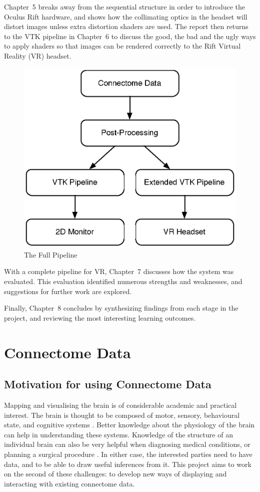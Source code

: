 \documentclass[MSc,paper=a4,pagesize=auto]{icldt}
\begin{document}
Chapter~5 breaks away from the sequential structure in order to introduce the Oculus Rift hardware, and shows how the collimating optics in the headset will distort images unless extra distortion shaders are used. The report then returns to the VTK pipeline in Chapter~6 to discuss the good, the bad and the ugly ways to apply shaders so that images can be rendered correctly to the Rift Virtual Reality (VR) headset. 

\begin{figure}[htbp!]
    \centering
    \includegraphics[scale=0.5]{resources/data_pipeline_overview}
    \caption{The Full Pipeline}
    \label{fig:the_full_pipeline}
\end{figure}

With a complete pipeline for VR, Chapter~7 discusses how the system was evaluated. This evaluation identified numerous strengths and weaknesses, and suggestions for further work are explored.

Finally, Chapter~8 concludes by synthesizing findings from each stage in the project, and reviewing the most interesting learning outcomes.

\chapter{Connectome Data}
\section{Motivation for using Connectome Data}
Mapping and visualising the brain is of considerable academic and practical interest. The brain is thought to be composed of motor, sensory, behavioural state, and cognitive systems \cite{Swanson2003}. Better knowledge about the physiology of the brain can help in understanding these systems. Knowledge of the structure of an individual brain can also be very helpful when diagnosing medical conditions, or planning a surgical procedure \cite{Golby2011}. In either case, the interested parties need to have data, and to be able to draw useful inferences from it. This project aims to work on the second of these challenges: to develop new ways of displaying and interacting with existing connectome data. 
\end{document}
